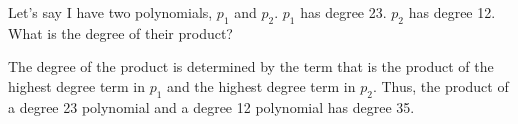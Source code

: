 \begin{Exercise}[title={Observations}, label=obsmultpoly]
  Let's say I have two polynomials, $p_1$ and $p_2$.  $p_1$ has degree
  23.  $p_2$ has degree 12.  What is the degree of their product?
\end{Exercise}
\begin{Answer}[ref=obsmultpoly]
  The degree of the product is determined by the term that is the
  product of the highest degree term in $p_1$ and the highest degree
  term in $p_2$. Thus, the product of a degree 23 polynomial and a
  degree 12 polynomial has degree 35.
\end{Answer}
  
